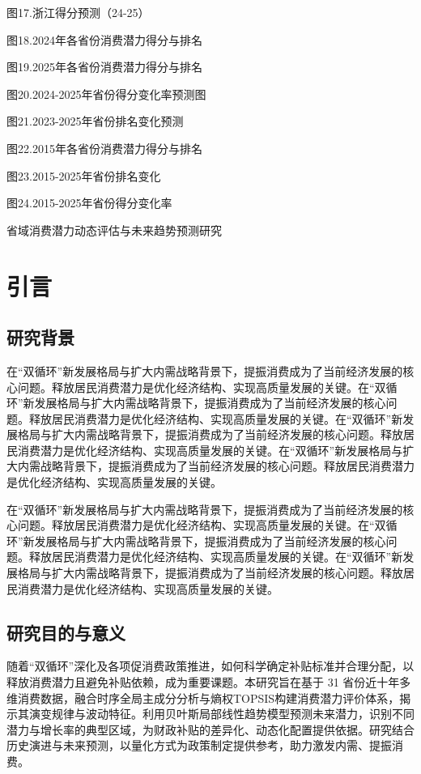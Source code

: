 \documentclass[UTF8,a4paper,zihao=-4,AutoFakeBold]{ctexart}
\newcommand{\fzxbsong}{\CJKfamily{fzxbsong}}
\begin{document}
	图17.浙江得分预测（24-25）
	
	图18.2024年各省份消费潜力得分与排名
	
	图19.2025年各省份消费潜力得分与排名
	
	图20.2024-2025年省份得分变化率预测图
	
	图21.2023-2025年省份排名变化预测
	
	图22.2015年各省份消费潜力得分与排名
	
	图23.2015-2025年省份排名变化
	
	图24.2015-2025年省份得分变化率
	
	
	
	\clearpage
	\begin{center}
		\fzxbsong\setlength{\baselineskip}{24pt}
		省域消费潜力动态评估与未来趋势预测研究
	\end{center}
	\section{引言}
	\subsection{研究背景}
	在“双循环”新发展格局与扩大内需战略背景下，提振消费成为了当前经济发展的核心问题。释放居民消费潜力是优化经济结构、实现高质量发展的关键。在“双循环”新发展格局与扩大内需战略背景下，提振消费成为了当前经济发展的核心问题。释放居民消费潜力是优化经济结构、实现高质量发展的关键。在“双循环”新发展格局与扩大内需战略背景下，提振消费成为了当前经济发展的核心问题。释放居民消费潜力是优化经济结构、实现高质量发展的关键。在“双循环”新发展格局与扩大内需战略背景下，提振消费成为了当前经济发展的核心问题。释放居民消费潜力是优化经济结构、实现高质量发展的关键。
	
	在“双循环”新发展格局与扩大内需战略背景下，提振消费成为了当前经济发展的核心问题。释放居民消费潜力是优化经济结构、实现高质量发展的关键。在“双循环”新发展格局与扩大内需战略背景下，提振消费成为了当前经济发展的核心问题。释放居民消费潜力是优化经济结构、实现高质量发展的关键。在“双循环”新发展格局与扩大内需战略背景下，提振消费成为了当前经济发展的核心问题。释放居民消费潜力是优化经济结构、实现高质量发展的关键。
	
	\subsection{研究目的与意义}
	随着“双循环”深化及各项促消费政策推进，如何科学确定补贴标准并合理分配，以释放消费潜力且避免补贴依赖，成为重要课题。本研究旨在基于 31 省份近十年多维消费数据，融合时序全局主成分分析与熵权TOPSIS构建消费潜力评价体系，揭示其演变规律与波动特征。利用贝叶斯局部线性趋势模型预测未来潜力，识别不同潜力与增长率的典型区域，为财政补贴的差异化、动态化配置提供依据。研究结合历史演进与未来预测，以量化方式为政策制定提供参考，助力激发内需、提振消费。
\end{document}

